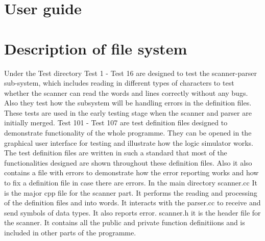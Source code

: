 \documentclass[12pt]{article}
\begin{document}
\section{User guide}

\newpage
\section{Description of file system}
Under the Test directory
Test 1 - Test 16 are designed to test the scanner-parser sub-system, which includes reading in different types of characters 
to test whether the scanner can read the words and lines correctly without any bugs. Also they test how the subsystem will be 
handling errors in the definition files. These tests are used in the early testing stage when the scanner and parser are 
initially merged.
Test 101 - Test 107 are test definition files designed to demonstrate functionality of the whole programme. They can be opened 
in the graphical user interface for testing and illustrate how the logic simulator works. The test definition files are written
 in such a standard that most of the functionalities designed are shown throughout these definition files. Also it also contains
 a file with errors to demonstrate how the error reporting works and how to fix a definition file in case there are errors.
In the main directory 
scanner.cc It is the major cpp file for the scanner part. It performs the reading and processing of the definition files and into
 words. It interacts with the parser.cc to receive and send symbols of data types. It also reports error.
scanner.h it is the header file for the scanner. It contains all the public and private function definitiions and is included in 
other parts of the programme.
\end{document}
